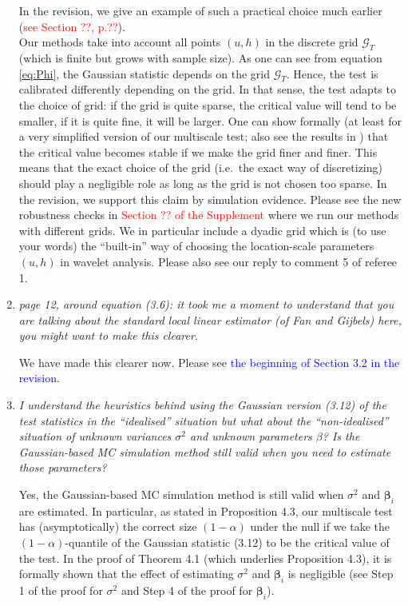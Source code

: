 \documentclass[a4paper,12pt]{article}
\begin{document}
\begin{enumerate}[label=\arabic*.,leftmargin=0.6cm]
In the revision, we give an example of such a practical choice much earlier (\textcolor{red}{see Section ??, p.??}). \\
Our methods take into account all points $(u,h)$ in the discrete grid $\mathcal{G}_T$ (which is finite but grows with sample size). As one can see from equation \eqref{eq:Phi}, the Gaussian statistic depends on the grid $\mathcal{G}_T$. Hence, the test is calibrated differently depending on the grid. In that sense, the test adapts to the choice of grid: if the grid is quite sparse, the critical value will tend to be smaller, if it is quite fine, it will be larger. One can show formally (at least for a very simplified version of our multiscale test; also see the results in \cite{DuembgenSpokoiny2001}) that the critical value becomes stable if we make the grid finer and finer. This means that the exact choice of the grid (i.e.\ the exact way of discretizing) should play a negligible role as long as the grid is not chosen too sparse. In the revision, we support this claim by simulation evidence. Please see the new robustness checks in \textcolor{red}{Section ?? of the Supplement} where we run our methods with different grids. We in particular include a dyadic grid which is (to use your words) the ``built-in'' way of choosing the location-scale parameters $(u, h)$ in wavelet analysis. Please also see our reply to comment 5 of referee 1. 


\item \textit{page 12, around equation (3.6): it took me a moment to understand that you are talking about the standard local linear estimator (of Fan and Gijbels) here, you might want to make this clearer.}

We have made this clearer now. Please see \textcolor{blue}{the beginning of Section 3.2 in the revision}.   


\item \textit{I understand the heuristics behind using the Gaussian version (3.12) of the test statistics in the ``idealised'' situation but what about the ``non-idealised'' situation of unknown variances $\sigma^ 2$ and unknown parameters $\beta$? Is the Gaussian-based MC simulation method still valid when you need to estimate those parameters?}  

Yes, the Gaussian-based MC simulation method is still valid when $\sigma^2$ and $\boldsymbol{\beta}_i$ are estimated. In particular, as stated in Proposition 4.3, our multiscale test has (asymptotically) the correct size $(1-\alpha)$ under the null if we take the $(1-\alpha)$-quantile of the Gaussian statistic (3.12) to be the critical value of the test. In the proof of Theorem 4.1 (which underlies Proposition 4.3), it is formally shown that the effect of estimating $\sigma^2$ and $\boldsymbol{\beta}_i$ is negligible (see Step 1 of the proof for $\sigma^2$ and Step 4 of the proof for $\boldsymbol{\beta}_i$).
  


\end{enumerate}
\end{document}
